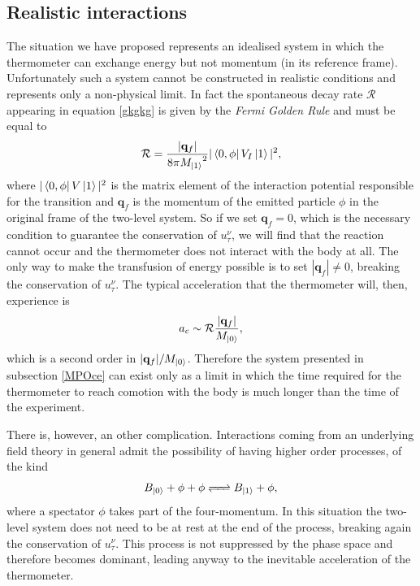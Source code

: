 \documentclass[twocolumn,usenatbib]{mnras2}
\newcommand{\vect}[1]{\mathbf{{#1}}}
\begin{document}
\subsection{Realistic interactions}\label{mareale}

The situation we have  proposed represents an idealised system in which the thermometer can exchange energy but not momentum (in its reference frame). Unfortunately such a system cannot be constructed in realistic conditions and represents only a non-physical limit. In fact the spontaneous decay rate $\mathcal{R}$ appearing in equation \eqref{gkgkg} is given by the \textit{Fermi Golden Rule} and must be equal to \citep{Peskin_book}
\begin{equation}
\mathcal{R} = \dfrac{|\vect{q}_f|}{8\pi {M_{\ket{1}}}^2} |\bra{0,\phi}V_I\ket{1}|^2,
\end{equation}
where  $|\bra{0,\phi}V\ket{1}|^2$ is the matrix element of the interaction potential responsible for the transition and $\vect{q}_f$ is the momentum of the emitted particle $\phi$ in the original frame of the two-level system. So if we set $\vect{q}_f=0$, which is the necessary condition to guarantee the conservation of $u_\tau^\nu$, we will find that the reaction cannot occur and the thermometer does not interact with the body at all. The only way to make the transfusion of energy possible is to set $|\vect{q}_f|\neq 0$, breaking the conservation of $u_\tau^\nu$. The typical acceleration that the thermometer will, then, experience is 
\begin{equation}
a_c \sim \mathcal{R}\dfrac{|\vect{q}_f|}{M_{\ket{0}}},
\end{equation}
which is a second order in $|\vect{q}_f|/M_{\ket{0}}$. Therefore the system presented in subsection \ref{MPOce} can exist only as a limit in which the time required for the thermometer to reach comotion with the body is much longer than the time of the experiment. 

There is, however, an other complication. Interactions coming from an underlying field theory in general admit the possibility of having higher order processes, of the kind
\begin{equation}\label{termiamo33}
B_{\ket{0}} + \phi +\phi \ce{ <=> } B_{\ket{1}}+\phi,
\end{equation} 
where a spectator $\phi$ takes part of the four-momentum. In this situation the two-level system does not need to be at rest at the end of the process, breaking again the conservation of $u_\tau^\nu$. This process is not suppressed by the phase space and therefore becomes dominant, leading anyway to the inevitable acceleration of the thermometer. 
\end{document}
